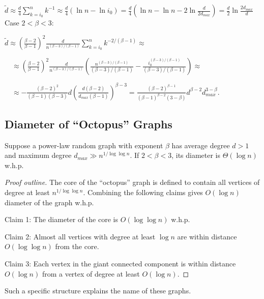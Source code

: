 $\tilde{d}\approx\frac{d}{4}\sum_{k=i_0}^{n}{k^{-1}}\approx\frac{d}{4}(\ln n-\ln i_0)
=\frac{d}{4}(\ln n-\ln n-2\ln\frac{d}{2d_{max}})=\frac{d}{2}\ln\frac{2d_{max}}{d}$
\\
Case $2<\beta<3$:

$\tilde{d}\approx\left(\frac{\beta-2}{\beta-1}\right)^2\frac{d}{n^{(\beta-3)/(\beta-1)}}
\sum_{k=i_0}^{n}{k^{-2/(\beta-1)}}\approx$

$\quad\approx\left(\frac{\beta-2}{\beta-1}\right)^2\frac{d}{n^{(\beta-3)/(\beta-1)}}
\left(\frac{n^{(\beta-3)/(\beta-1)}}{(\beta-3)/(\beta-1)}
    -\frac{i_0^{(\beta-3)/(\beta-1)}}{(\beta-3)/(\beta-1)}
\right)\approx$

$\quad\approx-\frac{(\beta-2)^2}{(\beta-1)(\beta-3)}d
\left(\frac{d(\beta-2)}{d_{max}(\beta-1)}\right)^{\beta-3}
=\frac{(\beta-2)^{\beta-1}}{(\beta-1)^{\beta-2}(3-\beta)}
d^{\beta-2}d_{max}^{3-\beta}$.

\subsection{Diameter of \texorpdfstring{``Octopus''}{"Octopus"} Graphs}

\begin{theorem}
    Suppose a power-law random graph with exponent $\beta$ has average degree $d>1$
    and maximum degree $d_{max}\gg n^{1/\log\log n}$.
    If $2<\beta<3$, its diameter is $\Theta(\log n)$ w.h.p.
\end{theorem}

\begin{proof}[Proof outline]
    The core of the ``octopus'' graph is defined to contain all vertices of degree
    at least $n^{1/\log\log n}$.
    Combining the following claims gives $O(\log n)$ diameter of the graph w.h.p.
    
    Claim 1: The diameter of the core is $O(\log\log n)$ w.h.p.
    
    Claim 2: Almost all vertices with degree at least $\log n$ are
    within distance $O(\log\log n)$ from the core.
    
    Claim 3: Each vertex in the giant connected component is within distance
    $O(\log n)$ from a vertex of degree at least $O(\log n)$.
\end{proof}

Such a specific structure explains the name of these graphs.

%
%
